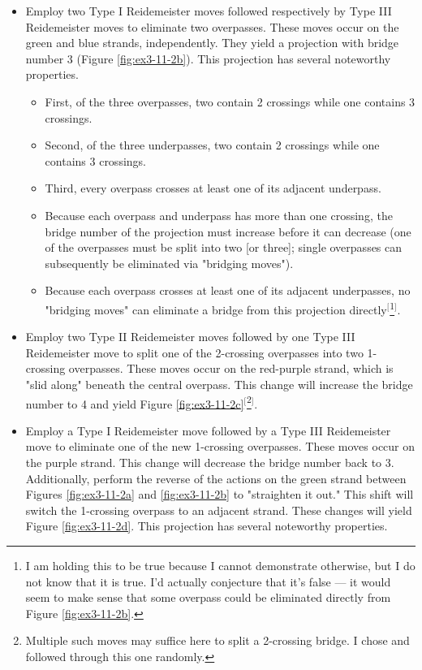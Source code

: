 \documentclass[titlepage]{article}
\numberwithin{figure}{section}
\numberwithin{table}{section}
\numberwithin{equation}{section}
\begin{document}
\begin{itemize}
\begin{itemize}
        \item Employ two Type I Reidemeister moves followed respectively by Type III Reidemeister moves to eliminate two overpasses. These moves occur on the green and blue strands, independently. They yield a projection with bridge number 3 (Figure \ref{fig:ex3-11-2b}). This projection has several noteworthy properties.
        \begin{itemize}
            \item First, of the three overpasses, two contain 2 crossings while one contains 3 crossings.
            \item Second, of the three underpasses, two contain 2 crossings while one contains 3 crossings.
            \item Third, every overpass crosses at least one of its adjacent underpass.
            \item Because each overpass and underpass has more than one crossing, the bridge number of the projection must increase before it can decrease (one of the overpasses must be split into two [or three]; single overpasses can subsequently be eliminated via "bridging moves").
            \item Because each overpass crosses at least one of its adjacent underpasses, no "bridging moves" can eliminate a bridge from this projection directly$^[$\footnote{I am holding this to be true because I cannot demonstrate otherwise, but I do not know that it is true. I'd actually conjecture that it's false --- it would seem to make sense that some overpass could be eliminated directly from Figure \ref{fig:ex3-11-2b}.}$^]$.
        \end{itemize}
        \item Employ two Type II Reidemeister moves followed by one Type III Reidemeister move to split one of the 2-crossing overpasses into two 1-crossing overpasses. These moves occur on the red-purple strand, which is "slid along" beneath the central overpass. This change will increase the bridge number to 4 and yield Figure \ref{fig:ex3-11-2c}$^[$\footnote{Multiple such moves may suffice here to split a 2-crossing bridge. I chose and followed through this one randomly.}$^]$.
        \item Employ a Type I Reidemeister move followed by a Type III Reidemeister move to eliminate one of the new 1-crossing overpasses. These moves occur on the purple strand. This change will decrease the bridge number back to 3. Additionally, perform the reverse of the actions on the green strand between Figures \ref{fig:ex3-11-2a} and \ref{fig:ex3-11-2b} to "straighten it out." This shift will switch the 1-crossing overpass to an adjacent strand. These changes will yield Figure \ref{fig:ex3-11-2d}. This projection has several noteworthy properties.

\end{itemize}
\end{itemize}
\end{document}
